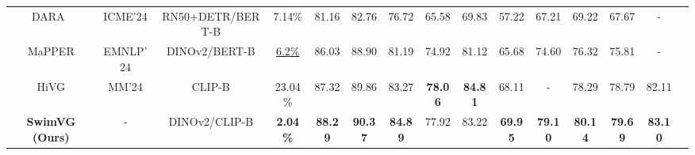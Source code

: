 \begin{table*}[!t]
{\begin{tabular}{lllccccccccccll}
\multicolumn{1}{c|}{DARA~\cite{liu2024dara}}  & \multicolumn{1}{c|}{ICME'24} &\multicolumn{1}{c|}{RN50+DETR/BERT-B}& \multicolumn{1}{c|}{7.14\%}   & 81.16   & 82.76  & \multicolumn{1}{c|}{76.72}  & 65.58  & 69.83  & \multicolumn{1}{c|}{57.22} & 67.21 & 69.22 & \multicolumn{1}{c|}{67.67}    & \multicolumn{1}{c}{-}&\\

\multicolumn{1}{c|}{MaPPER\cite{liu2024mapper}}   & \multicolumn{1}{c|}{EMNLP'24} &\multicolumn{1}{c|}{DINOv2/BERT-B}& \multicolumn{1}{c|}{\underline{6.2\%}} & {86.03} & {88.90} & \multicolumn{1}{c|}{81.19} &  {74.92}& {81.12} & \multicolumn{1}{c|}{65.68}& {74.60} & {76.32} & \multicolumn{1}{c|}{75.81}&\multicolumn{1}{c}{-}& \\

\multicolumn{1}{c|}{HiVG\cite{xiao2024hivg}}   & \multicolumn{1}{c|}{MM'24} &\multicolumn{1}{c|}{CLIP-B}& \multicolumn{1}{c|}{23.04\%} & {87.32} & {89.86} & \multicolumn{1}{c|}{83.27} &  {\textbf{78.06}}& \textbf{84.81} & \multicolumn{1}{c|}{68.11}& {-} & {78.29} & \multicolumn{1}{c|}{78.79}&\multicolumn{1}{c}{82.11}& \\

\multicolumn{1}{c|}{\textbf{SwimVG (Ours)}}   & \multicolumn{1}{c|}{-}& \multicolumn{1}{c|}{DINOv2/CLIP-B}& \multicolumn{1}{c|}{\textbf{2.04\%}} & \textbf{88.29} & \textbf{90.37} & \multicolumn{1}{c|}{\textbf{84.89}} &  77.92& 83.22 & \multicolumn{1}{c|}{\textbf{69.95}}& \textbf{79.10} & \textbf{80.14} & \multicolumn{1}{c|}{\textbf{79.69}}  &\multicolumn{1}{c}{\textbf{83.10}} &\\
\bottomrule


\end{tabular}
}
\vspace{-3mm}

\end{table*}
